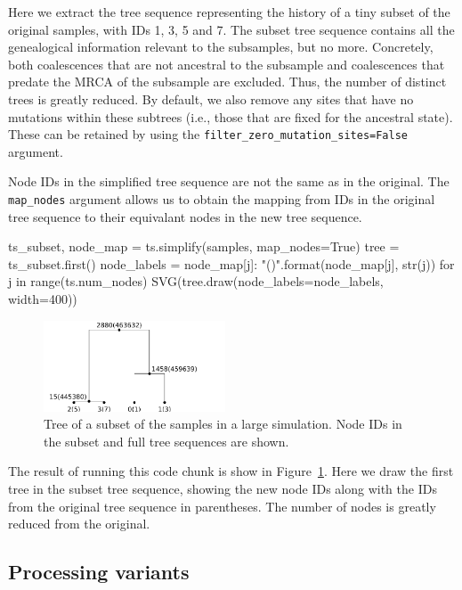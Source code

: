 \documentclass[graybox]{svmult}
\begin{document}
Here we extract the tree sequence representing the history of a tiny
subset of the original samples, with IDs 1, 3, 5 and 7. The subset tree
sequence contains all the genealogical information relevant to the
subsamples, but no more. Concretely, both coalescences that are not ancestral to the
subsample and coalescences that predate
the MRCA of the subsample are excluded. Thus, the number of distinct trees is greatly
reduced. By default, we also remove any sites that have no mutations
within these subtrees (i.e., those that are fixed for the ancestral
state). These can be retained by using the
\texttt{filter\_zero\_mutation\_sites=False} argument.

Node IDs in the simplified tree sequence are not the same as in the
original. The \texttt{map\_nodes} argument allows us to obtain the
mapping from IDs in the original tree sequence to their equivalant nodes
in the new tree sequence.

\begin{pythoncode}
ts_subset, node_map = ts.simplify(samples, map_nodes=True)
tree = ts_subset.first()
node_labels = {
    node_map[j]: "{}({})".format(node_map[j], str(j))
    for j in range(ts.num_nodes)}
SVG(tree.draw(node_labels=node_labels, width=400))
\end{pythoncode}

\begin{figure}[t]
\centering
\includegraphics[width=0.48\textwidth]{images/plot_13.pdf}
\caption{\label{fig-tree-subset} Tree of a subset of the samples in a large
simulation. Node IDs in the subset and full tree sequences are shown.}
\end{figure}

The result of running this code chunk is show in Figure~\ref{fig-tree-subset}.
Here we draw the first tree in the subset tree sequence, showing the new
node IDs along with the IDs from the original tree sequence in
parentheses. The number of nodes is greatly reduced from the original.

\subsection{Processing variants}\label{processing-variants}
\end{document}
